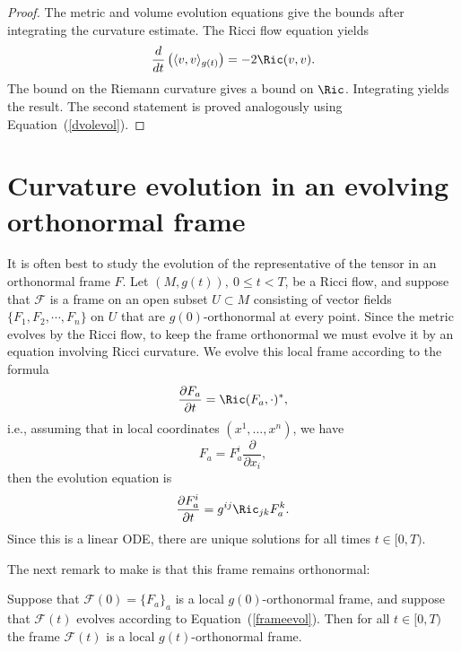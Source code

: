 \begin{proof}
\sketch The metric and volume evolution equations give the bounds after
integrating the curvature estimate.
The Ricci flow equation yields
$$\frac{d}{dt}\left(\langle v,v\rangle_{g(t)}\right)=-2\Ric(v,v).$$
The bound on the Riemann curvature gives a bound on $\Ric$.
Integrating yields the result. The second statement is proved
analogously using Equation~(\ref{dvolevol}).
\end{proof}



\section{Curvature evolution in an evolving orthonormal
frame}\label{evolframe}


It is often best to study the evolution of the representative of the
tensor in an orthonormal frame $F$. Let $(M,g(t)),\ 0\le t<T$, be a
Ricci flow, and suppose that ${\mathcal F}$ is a frame on an open
subset $U\subset M$ consisting of vector fields $\{F_{1},
F_{2},\cdots,F_{n}\}$ on $U$ that are $g(0)$-orthonormal at every
point. Since the metric evolves by the Ricci flow, to keep the frame
orthonormal we must evolve it by an equation involving Ricci
curvature. We evolve this local frame  according to the formula
\begin{equation}\label{frameevol} \frac{\partial F_{a}}{\partial t}
= \Ric(F_{a},\cdot)^*,\end{equation} i.e.,  assuming that in local
coordinates $(x^1,\ldots,x^n)$, we have
\[ F_{a}=F^{i}_{a}\frac{\partial}{\partial x_{i}}, \]
then the evolution equation is
\[\frac{\partial F^{i}_{a}}{\partial t} = g^{ij}\Ric_{jk}F^{k}_{a}.\]
 Since this is a linear ODE, there are unique
solutions for all times $t\in [0,T)$.


The next remark to make is that this frame remains orthonormal:

\begin{claim}\label{claim:orthonormal-frame-preservation}
\label{ortho}
\leanok

 Suppose that ${\mathcal F}(0)=\{F_a\}_a$ is a local  $g(0)$-orthonormal frame,
  and suppose that ${\mathcal F}(t)$ evolves according to Equation~(\ref{frameevol}). Then
 for all $t\in [0,T)$ the frame ${\mathcal F}(t)$ is a local $g(t)$-orthonormal frame.
\end{claim}


